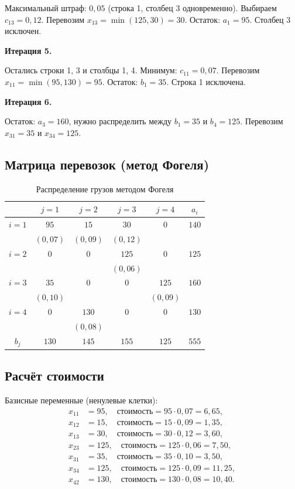 \documentclass[a4paper, final]{article}
\begin{document}
Максимальный штраф: $0{,}05$ (строка 1, столбец 3 одновременно). Выбираем $c_{13} = 0{,}12$.
Перевозим $x_{13} = \min(125, 30) = 30$. Остаток: $a_1 = 95$. Столбец 3 исключен.

\textbf{Итерация 5.}

Остались строки 1, 3 и столбцы 1, 4.
Минимум: $c_{11} = 0{,}07$. Перевозим $x_{11} = \min(95, 130) = 95$.
Остаток: $b_1 = 35$. Строка 1 исключена.

\textbf{Итерация 6.}

Остаток: $a_3 = 160$, нужно распределить между $b_1 = 35$ и $b_4 = 125$.
Перевозим $x_{31} = 35$ и $x_{34} = 125$.

\subsection{Матрица перевозок (метод Фогеля)}

\begin{table}[h!]
\centering
\caption{Распределение грузов методом Фогеля}
\label{tab:vogel}
\renewcommand{\arraystretch}{1.3}
\begin{tabular}{|c|c|c|c|c|c|}
\hline
 & $j=1$ & $j=2$ & $j=3$ & $j=4$ & $a_i$ \\
\hline
$i=1$ & $95$ & $15$ & $30$ & $0$ & $140$ \\
      & $(0{,}07)$ & $(0{,}09)$ & $(0{,}12)$ &  &  \\
\hline
$i=2$ & $0$ & $0$ & $125$ & $0$ & $125$ \\
      &  &  & $(0{,}06)$ &  &  \\
\hline
$i=3$ & $35$ & $0$ & $0$ & $125$ & $160$ \\
      & $(0{,}10)$ &  &  & $(0{,}09)$ &  \\
\hline
$i=4$ & $0$ & $130$ & $0$ & $0$ & $130$ \\
      &  & $(0{,}08)$ &  &  &  \\
\hline
$b_j$ & $130$ & $145$ & $155$ & $125$ & $555$ \\
\hline
\end{tabular}
\end{table}

\subsection{Расчёт стоимости}

Базисные переменные (ненулевые клетки):
\begin{align*}
x_{11} &= 95, \quad \text{стоимость} = 95 \cdot 0{,}07 = 6{,}65,\\
x_{12} &= 15, \quad \text{стоимость} = 15 \cdot 0{,}09 = 1{,}35,\\
x_{13} &= 30, \quad \text{стоимость} = 30 \cdot 0{,}12 = 3{,}60,\\
x_{23} &= 125, \quad \text{стоимость} = 125 \cdot 0{,}06 = 7{,}50,\\
x_{31} &= 35, \quad \text{стоимость} = 35 \cdot 0{,}10 = 3{,}50,\\
x_{34} &= 125, \quad \text{стоимость} = 125 \cdot 0{,}09 = 11{,}25,\\
x_{42} &= 130, \quad \text{стоимость} = 130 \cdot 0{,}08 = 10{,}40.
\end{align*}
\end{document}
